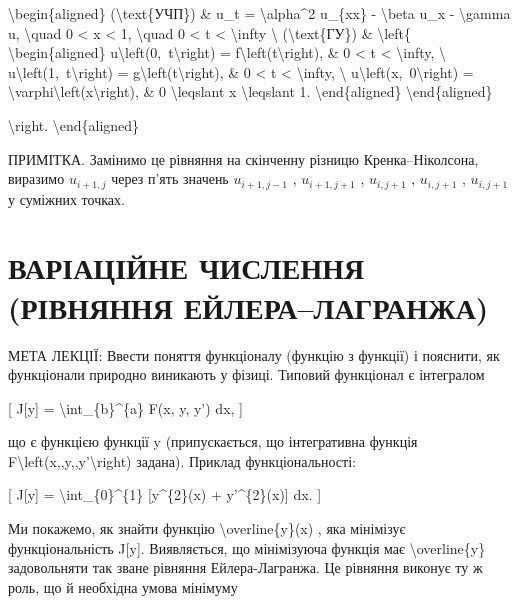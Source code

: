 \documentclass[
]{article}
\begin{document}
{\begin{enumerate}
  \textbackslash begin\{aligned\} (\textbackslash text\{УЧП\}) \& u\_t =
  \textbackslash alpha\^{}2 u\_\{xx\} - \textbackslash beta u\_x -
  \textbackslash gamma u, \textbackslash quad 0 \textless{} x
  \textless{} 1, \textbackslash quad 0 \textless{} t \textless{}
  \textbackslash infty \textbackslash{} (\textbackslash text\{ГУ\}) \&
  \textbackslash left\{ \textbackslash begin\{aligned\}
  u\textbackslash left(0,~t\textbackslash right) =
  f\textbackslash left(t\textbackslash right), \& 0 \textless{} t
  \textless{} \textbackslash infty, \textbackslash{}
  u\textbackslash left(1,~t\textbackslash right) =
  g\textbackslash left(t\textbackslash right), \& 0 \textless{} t
  \textless{} \textbackslash infty, \textbackslash{}
  u\textbackslash left(x,~0\textbackslash right) =
  \textbackslash varphi\textbackslash left(x\textbackslash right), \& 0
  \textbackslash leqslant x \textbackslash leqslant 1.
  \textbackslash end\{aligned\} \textbackslash end\{aligned\}

  \textbackslash right. \textbackslash end\{aligned\}
\end{enumerate}

ПРИМІТКА. Замінимо це рівняння на скінченну різницю Кренка--Ніколсона,
виразимо \(u_{i+1,j}\) через п'ять значень \(u_{i+1,j-1}\) ,
\(u_{i+1,j+1}\) , \(u_{i,j+1}\) , \(u_{i,j+1}\) , \(u_{i,j+1}\) у
суміжних точках.

\section{ВАРІАЦІЙНЕ ЧИСЛЕННЯ (РІВНЯННЯ
ЕЙЛЕРА--ЛАГРАНЖА)}\label{ux432ux430ux440ux456ux430ux446ux456ux439ux43dux435-ux447ux438ux441ux43bux435ux43dux43dux44f-ux440ux456ux432ux43dux44fux43dux43dux44f-ux435ux439ux43bux435ux440ux430ux43bux430ux433ux440ux430ux43dux436ux430}

МЕТА ЛЕКЦІЇ: Ввести поняття функціоналу (функцію з функції) і пояснити,
як функціонали природно виникають у фізиці. Типовий функціонал є
інтегралом

{[} J{[}y{]} = \textbackslash int\_\{b\}\^{}\{a\} F(x, y, y') dx, {]}

що є функцією функції y (припускається, що інтегративна функція
F\textbackslash left(x,,y,,y'\textbackslash right) задана). Приклад
функціональності:

{[} J{[}y{]} = \textbackslash int\_\{0\}\^{}\{1\} {[}y\^{}\{2\}(x) +
y'\^{}\{2\}(x){]} dx. {]}

Ми покажемо, як знайти функцію \textbackslash overline\{y\}(x) , яка
мінімізує функціональність J{[}y{]}. Виявляється, що мінімізуюча функція
має \textbackslash overline\{y\} задовольняти так зване рівняння
Ейлера-Лагранжа. Це рівняння виконує ту ж роль, що й необхідна умова
мінімуму

}
\end{document}
